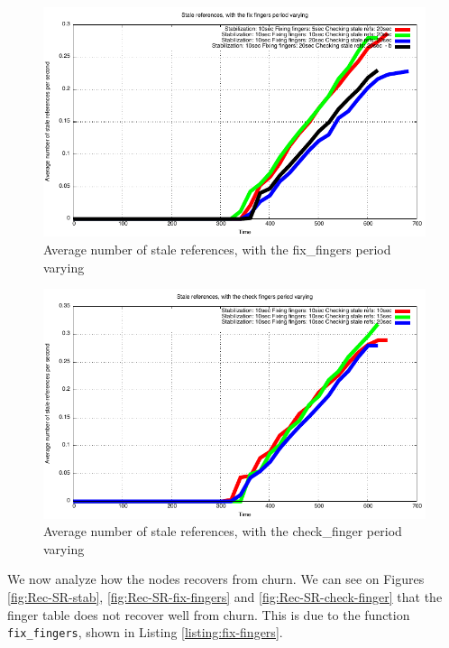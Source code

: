 \documentclass[a4paper, 11pt]{article}
\theoremstyle{plain}
\theoremstyle{definition}
\begin{document}
    
    \begin{figure}[h]
      \centering
      \includegraphics{plots/Average-SR-fix-fingers.pdf}
      \caption{Average number of stale references, with the fix\_fingers period varying}
      \label{fig:Av-SR-fix-fingers}
    \end{figure}
    
    
    \begin{figure}[h]
      \centering
      \includegraphics{plots/Average-SR-check-finger.pdf}
      \caption{Average number of stale references, with the check\_finger period varying}
      \label{fig:Av-SR-check-finger}
    \end{figure}

    

    We now analyze how the nodes recovers from churn. We can see on Figures \ref{fig:Rec-SR-stab},
    \ref{fig:Rec-SR-fix-fingers} and \ref{fig:Rec-SR-check-finger} that the finger table does not recover well
    from churn. This is due to the function \texttt{fix\_fingers}, shown in Listing \ref{listing:fix-fingers}. 
\end{document}
